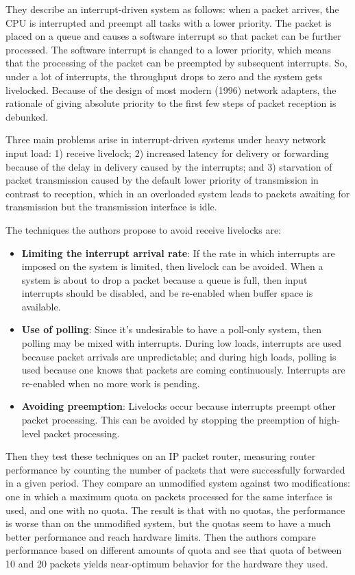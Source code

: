 \documentclass{article}
\begin{document}
They describe an interrupt-driven system as follows: when a packet arrives, the CPU is interrupted and preempt all tasks with a lower priority. The packet is placed on a queue and causes a software interrupt so that packet can be further processed. The software interrupt is changed to a lower priority, which means that the processing of the packet can be preempted by subsequent interrupts. So, under a lot of interrupts, the throughput drops to zero and the system gets livelocked. Because of the design of most modern (1996) network adapters, the rationale of giving absolute priority to the first few steps of packet reception is debunked.

Three main problems arise in interrupt-driven systems under heavy network input load: 1) receive livelock; 2) increased latency for delivery or forwarding because of the delay in delivery caused by the interrupts; and 3) starvation of packet transmission caused by the default lower priority of transmission in contrast to reception, which in an overloaded system leads to packets awaiting for transmission but the transmission interface is idle.

The techniques the authors propose to avoid receive livelocks are:

\begin{itemize}
	\item \textbf{Limiting the interrupt arrival rate}: If the rate in which interrupts are imposed on the system is limited, then livelock can be avoided. When a system is about to drop a packet because a queue is full, then input interrupts should be disabled, and be re-enabled when buffer space is available.

	\item \textbf{Use of polling}: Since it's undesirable to have a poll-only system, then polling may be mixed with interrupts. During low loads, interrupts are used because packet arrivals are unpredictable; and during high loads, polling is used because one knows that packets are coming continuously. Interrupts are re-enabled when no more work is pending.

	\item \textbf{Avoiding preemption}: Livelocks occur because interrupts preempt other packet processing. This can be avoided by stopping the preemption of high-level packet processing.

\end{itemize}

Then they test these techniques on an IP packet router, measuring router performance by counting the number of packets that were successfully forwarded in a given period. They compare an unmodified system against two modifications: one in which a maximum quota on packets processed for the same interface is used, and one with no quota. The result is that with no quotas, the performance is worse than on the unmodified system, but the quotas seem to have a much better performance and reach hardware limits. Then the authors compare performance based on different amounts of quota and see that quota of between 10 and 20 packets yields near-optimum behavior for the hardware they used.
\end{document}
